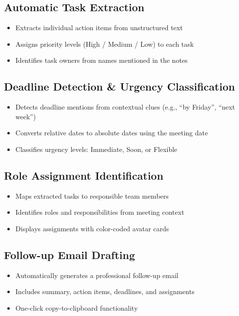 \documentclass[12pt,a4paper]{article}
\begin{document}
\subsection{Automatic Task Extraction}
\begin{itemize}
  \item Extracts individual action items from unstructured text
  \item Assigns priority levels (High / Medium / Low) to each task
  \item Identifies task owners from names mentioned in the notes
\end{itemize}

\subsection{Deadline Detection \& Urgency Classification}
\begin{itemize}
  \item Detects deadline mentions from contextual clues (e.g., ``by Friday'', ``next week'')
  \item Converts relative dates to absolute dates using the meeting date
  \item Classifies urgency levels: Immediate, Soon, or Flexible
\end{itemize}

\subsection{Role Assignment Identification}
\begin{itemize}
  \item Maps extracted tasks to responsible team members
  \item Identifies roles and responsibilities from meeting context
  \item Displays assignments with color-coded avatar cards
\end{itemize}

\subsection{Follow-up Email Drafting}
\begin{itemize}
  \item Automatically generates a professional follow-up email
  \item Includes summary, action items, deadlines, and assignments
  \item One-click copy-to-clipboard functionality
\end{itemize}
\end{document}
